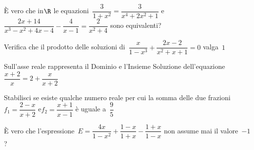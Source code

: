 \begin{esercizio}[*]
 \label{ese:3.49}
È vero che in\(\R\) le equazioni~\(\dfrac{3}{1 + x^{2}} = \dfrac{3}{x^{4} 
+2 x^{2} + 1}\) e~\(\dfrac{2 x + 14}{x^{3}-x^{2} + 4 x-4}-\dfrac{4}{x-1} 
=\dfrac{2}{x^{2} + 4}\) sono equivalenti?
\end{esercizio}

\begin{esercizio}[*]
 \label{ese:3.50}
Verifica che il prodotto delle soluzioni di~\(\dfrac{x}{1-x^{3}} 
+ \dfrac{2 x-2}{x^{2} + x + 1}=0\) valga~\(1\)
\end{esercizio}

\begin{esercizio}[*]
 \label{ese:3.51}
Sull'asse reale rappresenta il Dominio e l'Insieme Soluzione 
dell'equazione\\ 
\(\dfrac{x + 2}{x}=2+\dfrac{x}{x + 2}\)
\end{esercizio}

\begin{esercizio}[*]
 \label{ese:3.52}
Stabilisci se esiste qualche numero reale per cui la somma delle due 
frazioni \\
\(f_{1}=\dfrac{2-x}{x + 2}\) e\(f_{2}=\dfrac{x + 1}{x-1}\) è uguale 
a~\(\dfrac{9}{5}\)
\end{esercizio}

\begin{esercizio}[*]
 \label{ese:3.53}
È vero che l'espressione~\(E=\dfrac{4 x}{1-x^{2}} + \dfrac{1-x}{1 + 
x}-\dfrac{1 + x}{1-x}\) non assume mai il valore~\(-1\)?
\end{esercizio}

